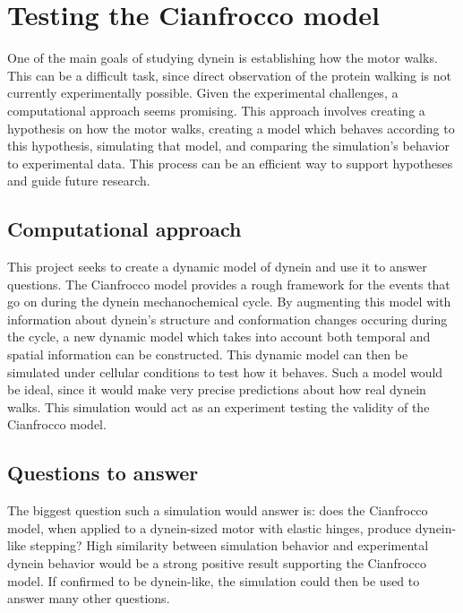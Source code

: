 \documentclass[
11pt, %
english, %
singlespacing, %
headsepline, %
chapterinoneline, %
]{MastersDoctoralThesis} %
\begin{document}


\section{Testing the Cianfrocco model}
One of the main goals of studying dynein is establishing how the motor walks. This can be a difficult task, since direct observation of the protein walking is not currently experimentally possible. Given the experimental challenges, a computational approach seems promising. This approach involves creating a hypothesis on how the motor walks, creating a model which behaves according to this hypothesis, simulating that model, and comparing the simulation's behavior to experimental data. This process can be an efficient way to support hypotheses and guide future research.\\

\subsection{Computational approach}
This project seeks to create a dynamic model of dynein and use it to answer questions. The Cianfrocco model provides a rough framework for the events that go on during the dynein mechanochemical cycle. By augmenting this model with information about dynein's structure and conformation changes occuring during the cycle, a new dynamic model which takes into account both temporal and spatial information can be constructed. This dynamic model can then be simulated under cellular conditions to test how it behaves. Such a model would be ideal, since it would make very precise predictions about how real dynein walks. This simulation would act as an experiment testing the validity of the Cianfrocco model.\\

\subsection{Questions to answer}
The biggest question such a simulation would answer is: does the Cianfrocco model, when applied to a dynein-sized motor with elastic hinges, produce dynein-like stepping? High similarity between simulation behavior and experimental dynein behavior would be a strong positive result supporting the Cianfrocco model. If confirmed to be dynein-like, the simulation could then be used to answer many other questions.\\
\end{document}
